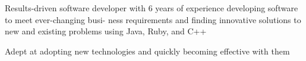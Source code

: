 %
    \begin{itemize*}
        \item Results-driven software developer with 6 years of experience developing software to meet ever-changing busi-
            ness requirements and finding innovative solutions to new and existing problems using Java, Ruby, and C++
        \item Adept at adopting new technologies and quickly becoming effective with them
    \end{itemize*}
